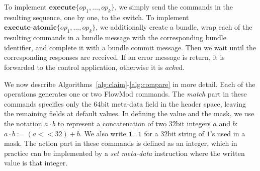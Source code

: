 \documentclass[conference]{sigcomm-alternate}
\newcommand{\hide}[1]{}
\newcommand{\concat}[0]{\cdot}
\newcommand{\add}{\textbf{add}\xspace}
\newcommand{\dele}{\textbf{delete}\xspace}
\newcommand{\checko}{\texttt{check\_overlap}\xspace}
\newcommand{\exec}{\textbf{execute}}
\newcommand{\execatomic}{\textbf{execute-atomic}}
\newcommand{\ack}{\textit{ack}}
\begin{document}
To implement  $\exec\{op_1,\ldots,op_k\}$, we simply send the commands in
the resulting sequence, one by one, to the switch.
%
To implement  $\execatomic\{op_1,\ldots,op_k\}$, we
additionally create a bundle, wrap each of the resulting commands in a
bundle message with the corresponding bundle identifier, and complete it
with a bundle commit message.
Then we wait until the
corresponding responses are received.
If an error message is return,
it is forwarded to the control application,
otherwise it is $\ack$ed.

We now describe Algorithms~\ref{alg:claim}-\ref{alg:compare} in more
detail.
Each of the operations generates one or two FlowMod commands.
The \textit{match} part in these commands specifies only the $64$bit meta-data
field in the header space, leaving the remaining fields at default
values.
In defining the value and the mask,
we
use the notation $a\concat b$ to represent a concatenation of two
$32$bit integers $a$ and $b$: $a\concat b := (a<<32)+b$.
We also write \texttt{1$\ldots$1} for  a $32$bit
string of $1$'s used in a mask.
%
The action part in these commands is defined as an integer, which in
practice can be implemented by a \emph{set meta-data} instruction where the written value is that integer.


\hide{
To simplify the presentation we set the FlowMod command field values with integers, according to the following guidelines:
\begin{itemize}

\item {\bf  Flag:} we often use the $\checko$ optional flag value to make the command execution dependent on switch state. In other cases, when the flag value remains zero, we omit the assignment.

\item {\bf  Match:} we consider the match part of an entry to be a ternary string of bounded length, represented by binary strings (integers) named value and mask. In general, the match can be applied to any set of supported packet header fields. In our implementation, the $64$bit meta-data field alone is sufficient. We sometimes use the concatenation of two $32$bit integers, denoted by $a\concat b$, to form one match value or mask, where $a\concat b := (a<<32)+b$.

\item {\bf Action:} we consider the action part of an entry to be an integer, which in practice can be implemented by a \emph{set meta-data} instruction where the written value is that integer.

\end{itemize}

In addition we use "op" as shortened form to a field that indicates whether the command should $\add$ or $\dele$ the specified flow entry. This corresponds to the FlowMod field named "command" which can receive values \textt{ofpfc\_add} and \texttt{ofpfc\_delete}.
}
\end{document}
